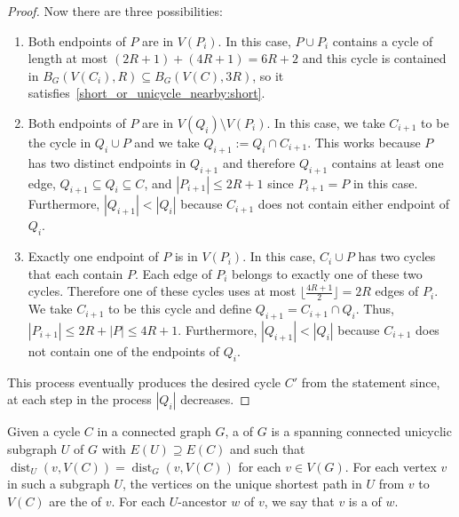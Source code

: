 \documentclass{patmorin}
\DeclareMathOperator{\dist}{dist}
\begin{document}
\begin{proof}
  Now there are three possibilities:
  \begin{enumerate}
    \item Both endpoints of $P$ are in $V(P_{i})$.
    In this case, $P\cup P_{i}$ contains a cycle of length at most
    $(2R+1)+(4R+1)=6R+2$ and this cycle is contained in $B_G(V(C_i),R)\subseteq B_G(V(C),3R)$, so it satisfies~\eqref{short_or_unicycle_nearby:short}.
    \item Both endpoints of $P$ are in $V(Q_{i})\setminus V(P_{i})$.
    In this case, we take $C_{i+1}$ to be the cycle     
    in $Q_{i}\cup P$ and
    we take $Q_{i+1}:= Q_i\cap C_{i+1}$. %
    This works because $P$ has two distinct endpoints in $Q_{i+1}$
    and therefore $Q_{i+1}$ contains at least one edge,
    $Q_{i+1}\subseteq Q_i\subseteq C$, and     
    $|P_{i+1}|\leq 2R+1$ since $P_{i+1}=P$ in this case.     
    Furthermore, $|Q_{i+1}| < |Q_{i}|$ because $C_{i+1}$ does not contain either endpoint of $Q_{i}$.
    \item Exactly one endpoint of $P$ is in $V(P_{i})$.
    In this case, $C_{i}\cup P$ has two cycles that each contain $P$.
    Each edge of $P_{i}$ belongs to exactly one of these two cycles.
    Therefore one of these cycles uses at most $\lfloor\frac{4R+1}{2}\rfloor=2R$ edges of $P_{i}$.
    We take $C_{i+1}$ to be this cycle and define
    $Q_{i+1}=C_{i+1}\cap Q_i$. %
    Thus, $|P_{i+1}| \leq 2R+|P|\leq 4R+1$.
    Furthermore, $|Q_{i+1}| < |Q_{i}|$ because $C_{i+1}$ does not contain one of the endpoints of $Q_{i}$.
  \end{enumerate}
  This process eventually produces the desired cycle $C'$ from the statement since, at each step in the process $|Q_i|$ decreases.
\end{proof}

Given a cycle $C$ in a connected graph $G$, a  of $G$ is a spanning connected unicyclic subgraph $U$ of $G$ with $E(U)\supseteq E(C)$ and such that $\dist_U(v,V(C))=\dist_G(v,V(C))$ for each $v\in V(G)$.  For each vertex $v$ in such a subgraph $U$, the vertices on the unique shortest path in $U$ from $v$ to $V(C)$ are the  of $v$.  For each $U$-ancestor $w$ of $v$, we say that $v$ is a  of $w$.
\end{document}
